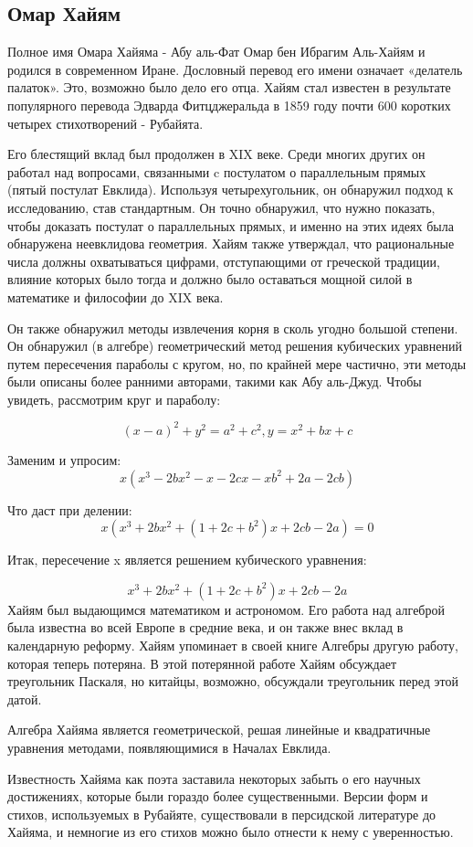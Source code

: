 \subsection{Омар Хайям}
Полное имя Омара Хайяма - Абу аль-Фат Омар бен Ибрагим Аль-Хайям и родился в современном Иране. Дословный перевод его имени означает «делатель палаток». Это, возможно было дело его отца. Хайям стал известен в результате популярного перевода Эдварда Фитцджеральда в 1859 году почти 600 коротких четырех стихотворений - Рубайята.

Его блестящий вклад был продолжен в XIX веке. Среди многих других он работал над вопросами, связанными c постулатом о параллельным прямых (пятый постулат Евклида). Используя четырехугольник, он обнаружил подход к исследованию, став стандартным. Он точно обнаружил, что нужно показать, чтобы доказать постулат о параллельных прямых, и именно на этих идеях была обнаружена неевклидова геометрия. Хайям также утверждал, что рациональные числа должны охватываться цифрами, отступающими от греческой традиции, влияние которых было тогда и должно было оставаться мощной силой в математике и философии до XIX века.

Он также обнаружил методы извлечения корня в сколь угодно большой степени. Он обнаружил (в алгебре) геометрический метод решения кубических уравнений путем пересечения параболы с кругом, но, по крайней мере частично, эти методы были описаны более ранними авторами, такими как Абу аль-Джуд. Чтобы увидеть, рассмотрим круг и параболу:

$$(x - a)^2 + y^2 = a^2 + c^2, y = x^2 + bx + c$$

Заменим и упросим:
$$x(x^3 - 2bx^2 -x -2cx -xb^2 +2a -2cb)$$

Что даст при делении:
$$x(x^3 + 2bx^2 +(1 + 2c + b^2)x + 2cb - 2a) = 0$$

Итак, пересечение x является решением кубического уравнения:

$$x^3 + 2bx^2 + (1 + 2c + b^2)x + 2cb - 2a$$
Хайям был выдающимся математиком и астрономом. Его работа над алгеброй была известна во всей Европе в средние века, и он также внес вклад в календарную реформу. Хайям упоминает в своей книге Алгебры другую работу, которая теперь потеряна. В этой потерянной работе Хайям обсуждает треугольник Паскаля, но китайцы, возможно, обсуждали треугольник перед этой датой.

Алгебра Хайяма является геометрической, решая линейные и квадратичные уравнения методами, появляющимися в Началах Евклида.

Известность Хайяма как поэта заставила некоторых забыть о его научных достижениях, которые были гораздо более существенными. Версии форм и стихов, используемых в Рубайяте, существовали в персидской литературе до Хайяма, и немногие из его стихов можно было отнести к нему с уверенностью.
